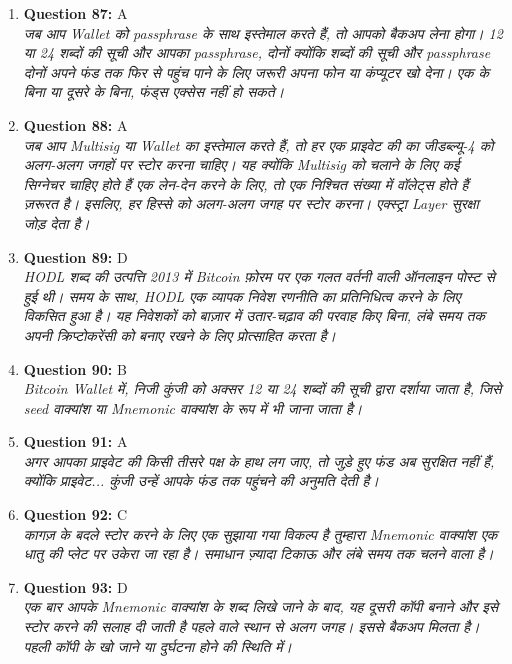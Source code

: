 \documentclass[12pt,a4paper]{article}
\begin{document}
\begin{enumerate}
\item \textbf{Question 87:} A
\\ \textit{जब आप Wallet को passphrase के साथ इस्तेमाल करते हैं, तो आपको बैकअप लेना होगा। 12 या 24 शब्दों की सूची और आपका passphrase, दोनों क्योंकि शब्दों की सूची और passphrase दोनों अपने फंड तक फिर से पहुंच पाने के लिए जरूरी अपना फोन या कंप्यूटर खो देना। एक के बिना या दूसरे के बिना, फंड्स एक्सेस नहीं हो सकते।}

\item \textbf{Question 88:} A
\\ \textit{जब आप Multisig या Wallet का इस्तेमाल करते हैं, तो हर एक प्राइवेट की का जीडब्ल्यू-4 को अलग-अलग जगहों पर स्टोर करना चाहिए। यह क्योंकि Multisig को चलाने के लिए कई सिग्नेचर चाहिए होते हैं एक लेन-देन करने के लिए, तो एक निश्चित संख्या में वॉलेट्स होते हैं ज़रूरत है। इसलिए, हर हिस्से को अलग-अलग जगह पर स्टोर करना। एक्स्ट्रा Layer सुरक्षा जोड़ देता है।}

\item \textbf{Question 89:} D
\\ \textit{HODL शब्द की उत्पत्ति 2013 में Bitcoin फ़ोरम पर एक गलत वर्तनी वाली ऑनलाइन पोस्ट से हुई थी। समय के साथ, HODL एक व्यापक निवेश रणनीति का प्रतिनिधित्व करने के लिए विकसित हुआ है। यह निवेशकों को बाज़ार में उतार-चढ़ाव की परवाह किए बिना, लंबे समय तक अपनी क्रिप्टोकरेंसी को बनाए रखने के लिए प्रोत्साहित करता है।}

\item \textbf{Question 90:} B
\\ \textit{Bitcoin Wallet में, निजी कुंजी को अक्सर 12 या 24 शब्दों की सूची द्वारा दर्शाया जाता है, जिसे seed वाक्यांश या Mnemonic वाक्यांश के रूप में भी जाना जाता है।}

\item \textbf{Question 91:} A
\\ \textit{अगर आपका प्राइवेट की किसी तीसरे पक्ष के हाथ लग जाए, तो जुड़े हुए फंड अब सुरक्षित नहीं हैं, क्योंकि प्राइवेट... कुंजी उन्हें आपके फंड तक पहुंचने की अनुमति देती है।}

\item \textbf{Question 92:} C
\\ \textit{कागज़ के बदले स्टोर करने के लिए एक सुझाया गया विकल्प है तुम्हारा Mnemonic वाक्यांश एक धातु की प्लेट पर उकेरा जा रहा है। समाधान ज़्यादा टिकाऊ और लंबे समय तक चलने वाला है।}

\item \textbf{Question 93:} D
\\ \textit{एक बार आपके Mnemonic वाक्यांश के शब्द लिखे जाने के बाद, यह दूसरी कॉपी बनाने और इसे स्टोर करने की सलाह दी जाती है पहले वाले स्थान से अलग जगह। इससे बैकअप मिलता है। पहली कॉपी के खो जाने या दुर्घटना होने की स्थिति में।}


\end{enumerate}
\end{document}
